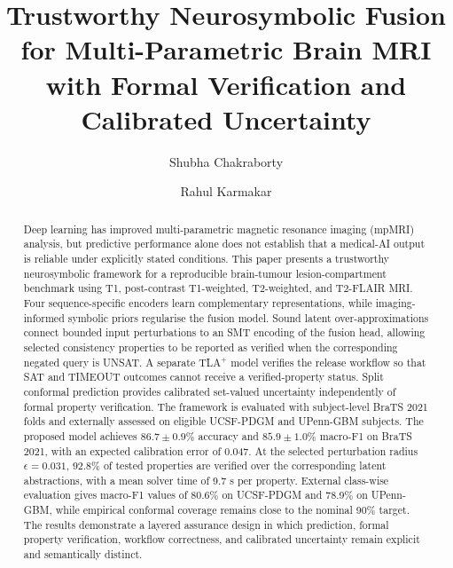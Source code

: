 \documentclass[preprint,11pt]{elsarticle}
\begin{document}
\begin{frontmatter}

\title{Trustworthy Neurosymbolic Fusion for Multi-Parametric Brain MRI with Formal Verification and Calibrated Uncertainty}

\author[ub]{Shubha Chakraborty}
\author[ub]{Rahul Karmakar}

\begin{abstract}
Deep learning has improved multi-parametric magnetic resonance imaging (mpMRI) analysis, but predictive performance alone does not establish that a medical-AI output is reliable under explicitly stated conditions. This paper presents a trustworthy neurosymbolic framework for a reproducible brain-tumour lesion-compartment benchmark using T1, post-contrast T1-weighted, T2-weighted, and T2-FLAIR MRI. Four sequence-specific encoders learn complementary representations, while imaging-informed symbolic priors regularise the fusion model. Sound latent over-approximations connect bounded input perturbations to an SMT encoding of the fusion head, allowing selected consistency properties to be reported as verified when the corresponding negated query is UNSAT. A separate TLA$^{+}$ model verifies the release workflow so that SAT and TIMEOUT outcomes cannot receive a verified-property status. Split conformal prediction provides calibrated set-valued uncertainty independently of formal property verification. The framework is evaluated with subject-level BraTS 2021 folds and externally assessed on eligible UCSF-PDGM and UPenn-GBM subjects. The proposed model achieves $86.7\pm0.9\%$ accuracy and $85.9\pm1.0\%$ macro-F1 on BraTS 2021, with an expected calibration error of 0.047. At the selected perturbation radius $\epsilon=0.031$, $92.8\%$ of tested properties are verified over the corresponding latent abstractions, with a mean solver time of 9.7 s per property. External class-wise evaluation gives macro-F1 values of 80.6\% on UCSF-PDGM and 78.9\% on UPenn-GBM, while empirical conformal coverage remains close to the nominal 90\% target. The results demonstrate a layered assurance design in which prediction, formal property verification, workflow correctness, and calibrated uncertainty remain explicit and semantically distinct.
\end{abstract}


\end{frontmatter}
\end{document}

